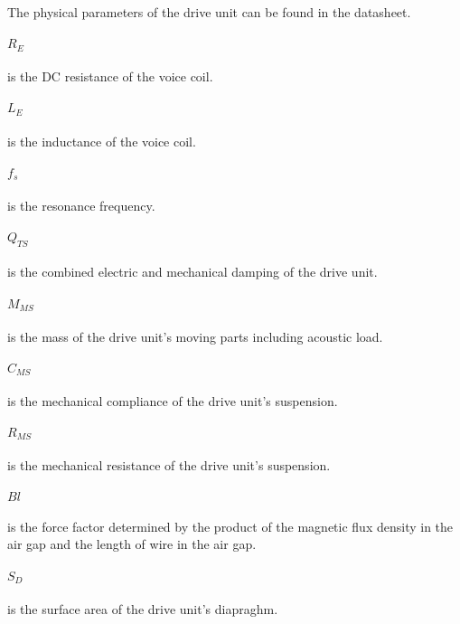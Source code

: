 The physical parameters of the drive unit can be found in the datasheet.


\paragraph{$R_E$} is the DC resistance of the voice coil.

\paragraph{$L_E$} is the inductance of the voice coil.

\paragraph{$f_s$} is the resonance frequency.

\paragraph{$Q_{TS}$} is the combined electric and mechanical damping of the drive unit.

\paragraph{$M_{MS}$} is the mass of the drive unit's moving parts including acoustic load.

\paragraph{$C_{MS}$} is the mechanical compliance of the drive unit's suspension.

\paragraph{$R_{MS}$} is the mechanical resistance of the drive unit's suspension.

\paragraph{$Bl$} is the force factor determined by the product of the magnetic flux density in the air gap and the length of wire in the air gap.

\paragraph{$S_D$} is the surface area of the drive unit's diapraghm.

